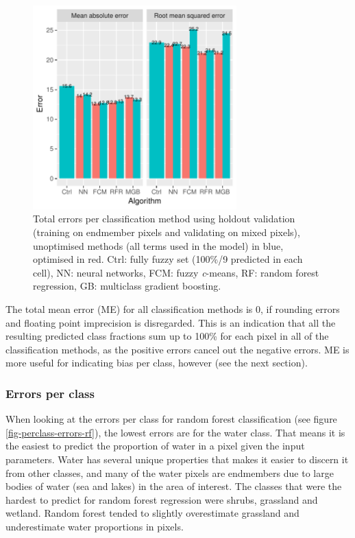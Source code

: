 \documentclass[a4paper,10pt]{book}
\begin{document}
\begin{figure}
  \centering
  \includegraphics[width=0.7\textwidth]{../plot/total-errors-gb}
  \caption{Total errors per classification method using holdout validation (training on endmember pixels and validating on mixed pixels), unoptimised methods (all terms used in the model) in blue, optimised in red. Ctrl: fully fuzzy set (100\%/9 predicted in each cell), NN: neural networks, FCM: fuzzy \textit{c}-means, RF: random forest regression, GB: multiclass gradient boosting.}
  \label{fig-total-errors-gb}
\end{figure}

The total mean error (ME) for all classification methods is 0, if rounding errors and floating point imprecision is disregarded. This is an indication that all the resulting predicted class fractions sum up to 100\% for each pixel in all of the classification methods, as the positive errors cancel out the negative errors. ME is more useful for indicating bias per class, however (see the next section).

\subsubsection{Errors per class}

When looking at the errors per class for random forest classification (see figure \ref{fig-perclass-errors-rf}), the lowest errors are for the water class. That means it is the easiest to predict the proportion of water in a pixel given the input parameters. Water has several unique properties that makes it easier to discern it from other classes, and many of the water pixels are endmembers due to large bodies of water (sea and lakes) in the area of interest. The classes that were the hardest to predict for random forest regression were shrubs, grassland and wetland. Random forest tended to slightly overestimate grassland and underestimate water proportions in pixels.
\end{document}
